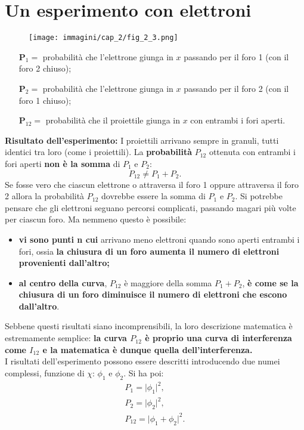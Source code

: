 \section*{Un esperimento con elettroni}
\begin{figure}[!htbp]
\begin{center}
\texttt{[image: immagini/cap\_2/fig\_2\_3.png]}
\end{center}
\end{figure}
\begin{itemize}
\item[\textbf{P$_1=$} ]probabilità che l'elettrone giunga in $x$ passando per il foro 1 (con il foro 2 chiuso);
\item[\textbf{P$_2=$} ]probabilità che l'elettrone giunga in $x$ passando per il foro 2 (con il foro 1 chiuso);
\item[\textbf{P$_{12}=$} ]probabilità che il proiettile giunga in $x$ con entrambi i fori aperti.
\end{itemize}
\textbf{Risultato dell'esperimento:} I proiettili arrivano sempre in granuli, tutti identici tra loro (come i proiettili). La \textbf{probabilità} $P_{12}$ ottenuta con entrambi i fori aperti \textbf{non è la somma} di $P_1$ e $P_2$:
	\begin{equation}
		\boxed{
			P_{12}\neq P_1+P_2.
			}
	\end{equation}
Se fosse vero che ciascun elettrone o attraversa il foro 1 oppure attraversa il foro 2 allora la probabilità $P_{12}$ dovrebbe essere la somma di $P_1$ e $P_2$. Si potrebbe pensare che gli elettroni seguano percorsi complicati, passando magari più volte per ciascun foro. Ma nemmeno questo è possibile:
\begin{itemize}
\item \textbf{vi sono punti n cui} arrivano meno elettroni quando sono aperti entrambi i fori, ossia \textbf{la chiusura di un foro aumenta il numero di elettroni provenienti dall'altro;}
\item \textbf{al centro della curva}, $P_{12}$ è maggiore della somma $P_1 + P_2$,  \textbf{è come se la chiusura di un foro diminuisce il numero di elettroni che escono dall'altro}.
\end{itemize}

Sebbene questi risultati siano incomprensibili, la loro descrizione matematica è estremamente semplice: \textbf{la curva $P_{12}$ è proprio una curva di interferenza come $I_{12}$ e la matematica è dunque quella dell'interferenza.}\\
I risultati dell'esperimento possono essere descritti introducendo due numei complessi, funzione di $\chi$: $\phi _1$ e $\phi _2$. Si ha poi:
\begin{equation}
\boxed{
  \begin{aligned}
& P_1= \lvert \phi _1 \rvert ^2, & \\
& P_2= \lvert \phi _2 \rvert ^2, &\\
& P_{12}= \lvert \phi _1 + \phi _2 \rvert ^2. 
\end{aligned}
}
\end{equation}
